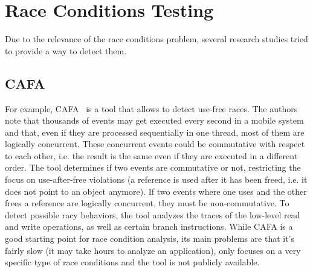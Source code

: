\documentclass[11pt,a4paper,notitlepage]{article}
\begin{document}
\section{Race Conditions Testing}\label{section_race_tools}
Due to the relevance of the race conditions problem, several research studies tried to provide a way to detect them.

\subsection{CAFA}
For example, CAFA~\cite{Hsiao:2014:RDE:2666356.2594330} is a tool that allows to detect use-free races. The authors note that thousands of events may get executed every second in a mobile system and that, even if they are processed sequentially in one thread, most of them are logically concurrent. These concurrent events could be commutative with respect to each other, i.e. the result is the same even if they are executed in a different order. The tool determines if two events are commutative or not, restricting the focus on use-after-free violations (a reference is used after it has been freed, i.e. it does not point to an object anymore). If two events where one uses and the other frees a reference are logically concurrent, they must be non-commutative. To detect possible racy behaviors, the tool analyzes the traces of the low-level read and write operations, as well as certain branch instructions. While CAFA is a good starting point for race condition analysis, its main problems are that it's fairly slow (it may take hours to analyze an application), only focuses on a very specific type of race conditions and the tool is not publicly available.
\end{document}

